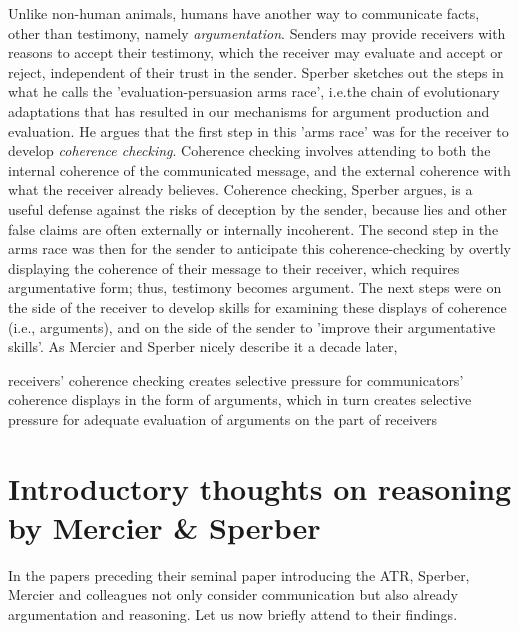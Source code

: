 Unlike non-human animals, humans have another way to communicate facts, other than testimony, namely \emph{argumentation}. Senders may provide receivers with reasons to accept their testimony, which the receiver may evaluate and accept or reject, independent of their trust in the sender.
Sperber sketches out the steps in what he calls the 'evaluation-persuasion arms race', i.e.\@ the chain of evolutionary adaptations that has resulted in our mechanisms for argument production and evaluation.
He argues that the first step in this 'arms race' was for the receiver to develop \emph{coherence checking}. Coherence checking involves attending to both the internal coherence of the communicated message, and the external coherence with what the receiver already believes. Coherence checking, Sperber argues, is a useful defense against the risks of deception by the sender, because lies and other false claims are often externally or internally incoherent.
The second step in the arms race was then for the sender to anticipate this coherence-checking by overtly displaying the coherence of their message to their receiver, which requires argumentative form; thus, testimony becomes argument.
The next steps were on the side of the receiver to develop skills for examining these displays of coherence (i.e., arguments), and on the side of the sender to 'improve their argumentative skills'.
As Mercier and Sperber nicely describe it a decade later,
\begin{quoting}
    receivers' coherence checking creates selective pressure for communicators' coherence displays in the form of arguments, which in turn creates selective pressure for adequate evaluation of arguments on the part of receivers
    \hfill \citep[p.~96]{MS11}
\end{quoting}

\section{Introductory thoughts on reasoning by Mercier \& Sperber}


In the papers preceding their \citeyear{MS11} seminal paper introducing the ATR, Sperber, Mercier and colleagues not only consider communication but also already argumentation and reasoning. Let us now briefly attend to their findings.

